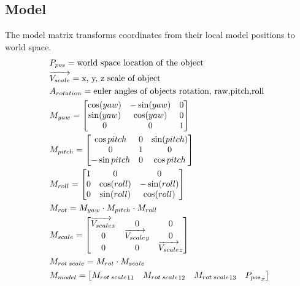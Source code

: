 \documentclass[12pt]{article}
\begin{document}
\subsection{Model}

The model matrix transforms coordinates from their local model positions to world space. 
\begin{gather}\begin{align}
		&P_{pos} = \text{world space location of the object} \notag\\
		&\overrightarrow{V_{scale}} = \text{x, y, z scale of object} \notag\\
		&A_{rotation} = \text{euler angles of objects rotation, raw,pitch,roll} \notag\\
		&M_{yaw} = \begin{bmatrix}
			\cos(yaw)&-\sin(yaw)&0\\
			\sin(yaw)&\cos(yaw)&0\\
			0&0&1
		\end{bmatrix} \notag\\
		&M_{pitch} = \begin{bmatrix}
			\cos{pitch}&0&\sin(pitch)\\
			0&1&0\\
			-\sin{pitch}&0&\cos{pitch}
		\end{bmatrix} \notag\\
		&M_{roll} = \begin{bmatrix}
			1&0&0\\
			0&\cos(roll)&-\sin(roll)\\
			0&\sin(roll)&\cos(roll)
		\end{bmatrix} \notag\\
		&M_{rot} = M_{yaw} \cdot M_{pitch} \cdot M_{roll} \notag \\
		&M_{scale} = \begin{bmatrix}
			\overrightarrow{V_{scale}}_x&0&0\\
			0&\overrightarrow{V_{scale}}_y&0\\
			0&0&\overrightarrow{V_{scale}}_z
		\end{bmatrix} \notag\\
		&M_{rot\hspace{0.2em}scale} = M_{rot}\cdot M_{scale} \notag\\
		&M_{model} = \begin{bmatrix}
			{M_{rot\hspace{0.2em}scale}}_{11}&{M_{rot\hspace{0.2em}scale}}_{12}&{M_{rot\hspace{0.2em}scale}}_{13}&{P_{pos}}_x\\

\end{bmatrix}
\end{align}
\end{gather}
\end{document}
